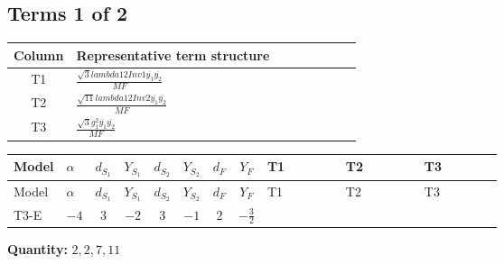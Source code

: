 \documentclass[8pt]{article}
\begin{document}
\begin{landscape}
\subsection*{Terms 1 of 2}
\begin{center}
\begin{tabular}{@{}c >{\raggedright\arraybackslash}p{0.82\linewidth}@{}}
\toprule
Column & Representative term structure \\
\midrule
T1 & \(\displaystyle \frac{\sqrt{3} lambda12Inv1 \overline{y_{1}} \overline{y_{2}}}{MF}\) \\
\midrule
T2 & \(\displaystyle \frac{\sqrt{11} lambda12Inv2 \overline{y_{1}} \overline{y_{2}}}{MF}\) \\
\midrule
T3 & \(\displaystyle \frac{\sqrt{3} g_{1}^{2} \overline{y_{1}} \overline{y_{2}}}{MF}\) \\
\midrule
\bottomrule
\end{tabular}
\end{center}
\smallskip
\tiny
\begin{longtable}{@{}llcccccc >{\raggedright\arraybackslash}p{0.21\linewidth} >{\raggedright\arraybackslash}p{0.21\linewidth} >{\raggedright\arraybackslash}p{0.21\linewidth}@{}}
\toprule
Model & $\alpha$ & $d_{S_1}$ & $Y_{S_1}$ & $d_{S_2}$ & $Y_{S_2}$ & $d_F$ & $Y_F$ & T1 & T2 & T3 \\
\midrule
\endfirsthead
\toprule
Model & $\alpha$ & $d_{S_1}$ & $Y_{S_1}$ & $d_{S_2}$ & $Y_{S_2}$ & $d_F$ & $Y_F$ & T1 & T2 & T3 \\
\midrule
\endhead
T3-E & $-4$ & $3$ & $-2$ & $3$ & $-1$ & $2$ & $-\frac{3}{2}$ & \scriptsize\adjustbox{max width=\linewidth}{$\begin{gathered} - \frac{\sqrt{3} lambda12Inv1 \overline{y_{1}} \overline{y_{2}}}{6 MF}\end{gathered}$} & \scriptsize\adjustbox{max width=\linewidth}{$\begin{gathered} \frac{3 \sqrt{11} lambda12Inv2 \overline{y_{1}} \overline{y_{2}}}{22 MF}\end{gathered}$} & \scriptsize\adjustbox{max width=\linewidth}{$\begin{gathered} \frac{9 \sqrt{3} g_{1}^{2} \overline{y_{1}} \overline{y_{2}}}{8 MF}\end{gathered}$} \\
\midrule
\bottomrule
\end{longtable}
\clearpage
\noindent\textbf{Quantity: }$\mathrm{2,2,7,11}$\par\smallskip

\end{landscape}
\end{document}
